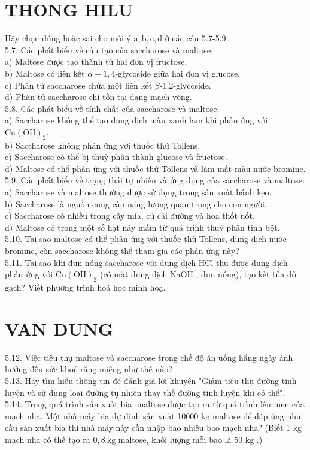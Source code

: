 \documentclass[10pt]{article}
\begin{document}
\section*{THONG HILU}
Hãy chọn đúng hoặc sai cho mỗi ý $\mathrm{a}, \mathrm{b}, \mathrm{c}, \mathrm{d}$ ở các câu 5.7-5.9.\\
5.7. Các phát biểu về cấu tạo của saccharose và maltose:\\
a) Maltose được tạo thành từ hai đơn vị fructose.\\
b) Maltose có liên kết $\alpha-1,4$-glycoside giữa hai đơn vị glucose.\\
c) Phân tử saccharose chứa một liên kết $\beta$-1,2-glycoside.\\
d) Phân tử saccharose chỉ tồn tại dạng mạch vòng.\\
5.8. Các phát biểu về tính chất của saccharose và maltose:\\
a) Saccharose không thể tạo dung dịch màu xanh lam khi phản ứng với $\mathrm{Cu}(\mathrm{OH})_{2}$.\\
b) Saccharose không phản ứng với thuốc thử Tollens.\\
c) Saccharose có thể bị thuỷ phân thành glucose và fructose.\\
d) Maltose có thể phản ứng với thuốc thử Tollens và làm mất màu nước bromine.\\
5.9. Các phát biểu về trạng thái tự nhiên và ứng dụng của saccharose và maltose:\\
a) Saccharose và maltose thường được sử dụng trong sản xuất bánh kẹo.\\
b) Saccharose là nguồn cung cấp năng lượng quan trọng cho con người.\\
c) Saccharose có nhiều trong cây mía, củ cải đường và hoa thốt nốt.\\
d) Maltose có trong một số hạt nảy mầm từ quá trình thuỷ phân tinh bột.\\
5.10. Tại sao maltose có thể phản ứng với thuốc thử Tollens, dung dịch nước bromine, còn saccharose không thể tham gia các phản ứng này?\\
5.11. Tại sao khi đun nóng saccharose với dung dịch HCl thu được dung dịch phản ứng với $\mathrm{Cu}(\mathrm{OH})_{2}$ (có mặt dung dịch NaOH , đun nóng), tạo kết tủa đỏ gạch? Viết phương trình hoá học minh hoạ.

\section*{VAN DUNG}
5.12. Việc tiêu thụ maltose và saccharose trong chế độ ăn uống hằng ngày ảnh hưởng đến sức khoẻ răng miệng như thế nào?\\
5.13. Hãy tìm hiểu thông tin để đánh giá lời khuyên "Giảm tiêu thụ đường tinh luyện và sử dụng loại đường tự nhiên thay thế đường tinh luyện khi có thể".\\
5.14. Trong quá trình sản xuất bia, maltose được tạo ra từ quá trình lên men của mạch nha. Một nhà máy bia dự định sản xuất 10000 kg maltose để đáp ứng nhu cầu sản xuất bia thì nhà máy này cần nhập bao nhiêu bao mạch nha? (Biết 1 kg mạch nha có thể tạo ra $0,8 \mathrm{~kg}$ maltose, khối lượng mỗi bao là 50 kg .)
\end{document}
